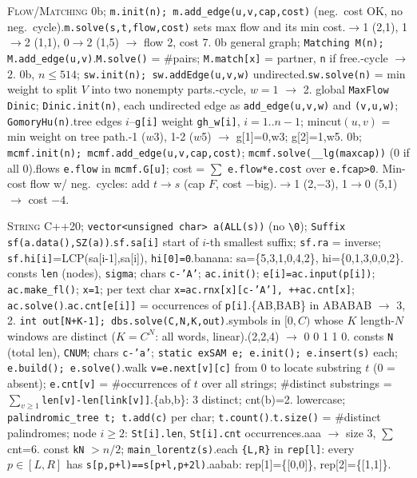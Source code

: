 {\textsc{Flow/Matching}
\io 0b; \texttt{m.init(n); m.add\_edge(u,v,cap,cost)} (neg.\ cost OK, no neg.\ cycle).\oo \texttt{m.solve(s,t,flow,cost)} sets max flow and its min cost.$\to$1 (2,1), 1$\to$2 (1,1), 0$\to$2 (1,5) $\to$ flow 2, cost 7.
\io 0b general graph; \texttt{Matching M(n); M.add\_edge(u,v)}.\oo \texttt{M.solve()} = \#pairs; \texttt{M.match[x]} = partner, \texttt{n} if free.-cycle $\to$ 2.
\io 0b, $n\le514$; \texttt{sw.init(n); sw.addEdge(u,v,w)} undirected.\oo \texttt{sw.solve(n)} = min weight to split $V$ into two nonempty parts.-cycle, $w=1$ $\to$ 2.
\io global \texttt{MaxFlow Dinic}; \texttt{Dinic.init(n)}, each undirected edge as \texttt{add\_edge(u,v,w)} and \texttt{(v,u,w)}; \texttt{GomoryHu(n)}.\oo tree edges $i$--\texttt{g[i]} weight \texttt{gh\_w[i]}, $i=1..n-1$; mincut$(u,v)$ = min weight on tree path.-1 ($w$3), 1-2 ($w$5) $\to$ g[1]=0,w3; g[2]=1,w5.
\io 0b; \texttt{mcmf.init(n); mcmf.add\_edge(u,v,cap,cost)}; \texttt{mcmf.solve(\_\_lg(maxcap))} (0 if all 0).\oo flows \texttt{e.flow} in \texttt{mcmf.G[u]}; cost = $\sum$ \texttt{e.flow*e.cost} over \texttt{e.fcap>0}. Min-cost flow w/ neg.\ cycles: add $t\to s$ (cap $F$, cost $-$big).$\to$1 (2,$-3$), 1$\to$0 (5,1) $\to$ cost $-4$.

\textsc{String}
\io C++20; \texttt{vector<unsigned char> a(ALL(s))} (no \texttt{\textbackslash0}); \texttt{Suffix sf(a.data(),SZ(a))}.\oo \texttt{sf.sa[i]} start of $i$-th smallest suffix; \texttt{sf.ra} = inverse; \texttt{sf.hi[i]}=LCP(sa[i-1],sa[i]), \texttt{hi[0]=0}.\ex banana: sa=\{5,3,1,0,4,2\}, hi=\{0,1,3,0,0,2\}.
\io consts \texttt{len} (nodes), \texttt{sigma}; chars \texttt{c-'A'}; \texttt{ac.init()}; \texttt{e[i]=ac.input(p[i])}; \texttt{ac.make\_fl()}; \texttt{x=1}; per text char \texttt{x=ac.rnx[x][c-'A'], ++ac.cnt[x]}; \texttt{ac.solve()}.\oo \texttt{ac.cnt[e[i]]} = occurrences of \texttt{p[i]}.\ex \{AB,BAB\} in ABABAB $\to$ 3, 2.
\io \texttt{int out[N+K-1]; dbs.solve(C,N,K,out)}.\oo symbols in $[0,C)$ whose $K$ length-$N$ windows are distinct ($K=C^N$: all words, linear).\ex (2,2,4) $\to$ 0 0 1 1 0.
\io consts \texttt{N} (total len), \texttt{CNUM}; chars \texttt{c-'a'}; \texttt{static exSAM e; e.init(); e.insert(s)} each; \texttt{e.build(); e.solve()}.\oo walk \texttt{v=e.next[v][c]} from 0 to locate substring $t$ (0 = absent); \texttt{e.cnt[v]} = \#occurrences of $t$ over all strings; \#distinct substrings = $\sum_{v\ge1}$\texttt{len[v]-len[link[v]]}.\ex \{ab,b\}: 3 distinct; cnt(b)=2.
\io lowercase; \texttt{palindromic\_tree t; t.add(c)} per char; \texttt{t.count()}.\oo \texttt{t.size()} = \#distinct palindromes; node $i\ge2$: \texttt{St[i].len}, \texttt{St[i].cnt} occurrences.\ex aaa $\to$ size 3, $\sum$cnt=6.
\io const \texttt{kN} $>n/2$; \texttt{main\_lorentz(s)}.\oo each \texttt{\{L,R\}} in \texttt{rep[l]}: every $p\in[L,R]$ has \texttt{s[p,p+l)==s[p+l,p+2l)}.\ex aabab: rep[1]=\{[0,0]\}, rep[2]=\{[1,1]\}.

}
